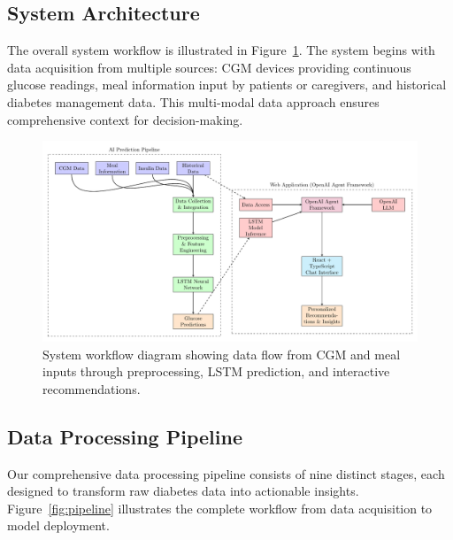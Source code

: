\documentclass[acmsmall]{acmart}
\begin{document}
\subsection{System Architecture}

The overall system workflow is illustrated in Figure~\ref{fig:workflow}. The system begins with data acquisition from multiple sources: CGM devices providing continuous glucose readings, meal information input by patients or caregivers, and historical diabetes management data. This multi-modal data approach ensures comprehensive context for decision-making.

\begin{figure}[h]
  \centering
  \includegraphics[width=\linewidth]{system_workflow}
  \caption{System workflow diagram showing data flow from CGM and meal inputs through preprocessing, LSTM prediction, and interactive recommendations.}
  \label{fig:workflow}
\end{figure}

\subsection{Data Processing Pipeline}

Our comprehensive data processing pipeline consists of nine distinct stages, each designed to transform raw diabetes data into actionable insights. Figure~\ref{fig:pipeline} illustrates the complete workflow from data acquisition to model deployment.
\end{document}
